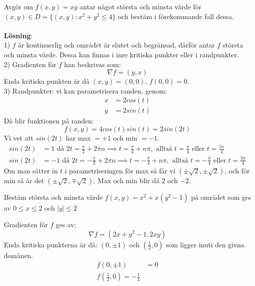 \documentclass{report}
\begin{document}

\pagebreak
\ex{}
{
	Avgör om $ f(x,y) = xy $ antar något största och minsta värde för $ (x,y) \in D = \{(x,y) : x^2+y^2 \le 4 \} $ och bestäm i förekommande fall dessa.\\\\

\textbf{Lösning}:\\
1) $ f $ är kontinuerlig och området är slutet och begränsad, därför antar $ f $ största och minsta värde. Dessa kan finnas i inre kritiska punkter eller i randpunkter.\\
2) Gradienten för $ f $ kan beskrivas som:
\begin{equation*}
\nabla f = (y, x)
\end{equation*}
Enda kritiska punkten är då $ (x,y) = (0,0) $. $ f(0,0) = 0 $.\\
3) Randpunkter: vi kan parametrisera randen, genom:
\begin{align*}
	x &= 2cos(t)\\
	y &= 2sin(t)
\end{align*}
Då blir funktionen på randen:
\begin{equation*}
f(x,y) = 4cos(t)sin(t) = 2sin(2t)
\end{equation*}
Vi vet att $ sin(2t) $ har max $ = +1 $ och min $ = -1 $.
\begin{align*}
	sin(2t) &= 1 \text{ då } 2t = \frac{\pi}{2} + 2\pi n \implies t = \frac{\pi}{4} + n \pi, \text{ alltså } t = \frac{\pi}{4} \text{ eller } t = \frac{5\pi}{4}\\
	sin(2t) &= -1 \text{ då } 2t = - \frac{\pi}{2} + 2\pi n \implies t = - \frac{\pi}{4} + n \pi, \text{ alltså } t = - \frac{\pi}{4} \text{ eller } t = \frac{3\pi}{4} 
\end{align*}
Om man sätter in $ t $ i parametriseringen för max så får vi $ (\pm \sqrt{2} , \pm \sqrt{2} ) $, och för min så är det $ (\pm \sqrt{2}, \mp \sqrt{2} ) $. Max och min blir då $ 2 $ och $ -2 $.   
}

\qs{}
{
Bestäm största och minsta värde $ f(x,y) = x^2+x(y^2-1) $ på området som ges av $ 0 \le x \le 2 $ och $ |y| \le 2 $
}

\sol Gradienten för $ f $ ges av:
\begin{equation*}
	\nabla f = (2x+y^2-1,2xy)
\end{equation*}
Enda kritiska punkterna är då: $ (0, \pm 1) $  och $ ( \frac{1}{2}  , 0) $ som ligger inuti den givna domänen.
\begin{align*}
	f(0, \pm 1) &= 0\\
	f( \frac{1}{2} , 0) = - \frac{1}{4} 
\end{align*}
\end{document}
